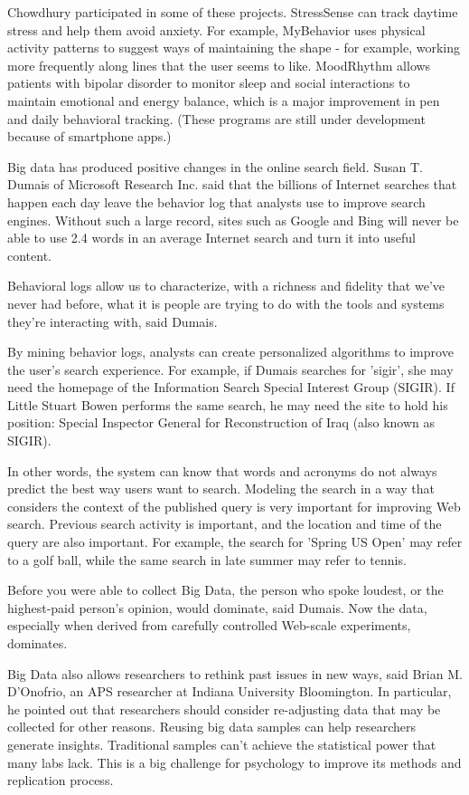 Chowdhury participated in some of these projects. StressSense can track daytime stress and help them avoid anxiety. For example, MyBehavior uses physical activity patterns to suggest ways of maintaining the shape - for example, working more frequently along lines that the user seems to like. MoodRhythm allows patients with bipolar disorder to monitor sleep and social interactions to maintain emotional and energy balance, which is a major improvement in pen and daily behavioral tracking. (These programs are still under development because of smartphone apps.)

Big data has produced positive changes in the online search field. Susan T. Dumais of Microsoft Research Inc. said that the billions of Internet searches that happen each day leave the behavior log that analysts use to improve search engines. Without such a large record, sites such as Google and Bing will never be able to use 2.4 words in an average Internet search and turn it into useful content.

Behavioral logs allow us to characterize, with a richness and fidelity that we’ve never had before, what it is people are trying to do with the tools and systems they’re interacting with, said Dumais\cite{editor01}.

By mining behavior logs, analysts can create personalized algorithms to improve the user's search experience. For example, if Dumais searches for 'sigir', she may need the homepage of the Information Search Special Interest Group (SIGIR). If Little Stuart Bowen performs the same search, he may need the site to hold his position: Special Inspector General for Reconstruction of Iraq (also known as SIGIR).

In other words, the system can know that words and acronyms do not always predict the best way users want to search. Modeling the search in a way that considers the context of the published query is very important for improving Web search. Previous search activity is important, and the location and time of the query are also important. For example, the search for 'Spring US Open' may refer to a golf ball, while the same search in late summer may refer to tennis.

Before you were able to collect Big Data, the person who spoke loudest, or the highest-paid person’s opinion, would dominate, said Dumais. Now the data, especially when derived from carefully controlled Web-scale experiments, dominates.\cite{editor01}

Big Data also allows researchers to rethink past issues in new ways, 
said Brian M. D'Onofrio, an APS researcher at Indiana University Bloomington. 
In particular, he pointed out that researchers should consider re-adjusting 
data that may be collected for other reasons. Reusing big data samples can 
help researchers generate insights. Traditional samples can't achieve the 
statistical power that many labs lack. This is a big challenge for psychology 
to improve its methods and replication process.

